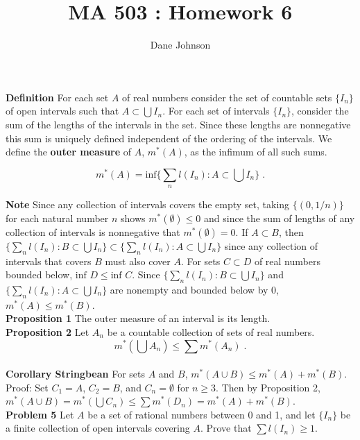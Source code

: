 \documentclass[a4paper]{article}
\title{MA 503 : Homework 6}
\author{Dane Johnson}
\begin{document}
\maketitle

{\bf Definition} For each set $A$ of real numbers consider the set of countable sets $\{I_n\}$ of open intervals such that $A \subset \bigcup I_n$. For each set of intervals $\{I_n\}$, consider the sum of the lengths of the intervals in the set. Since these lengths are nonnegative this sum is uniquely defined independent of the ordering of the intervals. We define the {\bf outer measure} of $A$, $m^*(A)$, as the infimum of all such sums.

$$m^*(A) = \text{inf}\{\sum_n l(I_n) : A \subset \bigcup I_n\} \;.$$

{\bf Note} Since any collection of intervals covers the empty set, taking $\{(0,1/n)\}$ for each natural number $n$ shows $m^*(\emptyset) \leq 0$ and since the sum of lengths of any collection of intervals is nonnegative that $m^*(\emptyset) = 0$. If $A\subset B$, then $\{\sum_n l(I_n) : B \subset \bigcup I_n\} \subset \{\sum_n l(I_n) : A \subset \bigcup I_n\}$ since any collection of intervals that covers $B$ must also cover $A$. For sets $C \subset D$ of real numbers bounded below, $\text{inf } D \leq \text{inf } C$. Since $\{\sum_n l(I_n) : B \subset \bigcup I_n\}$ and $\{\sum_n l(I_n) : A \subset \bigcup I_n\}$ are nonempty and bounded below by 0, $m^*(A) \leq m^*(B)$.\\

{\bf Proposition 1} The outer measure of an interval is its length. \\

{\bf Proposition 2} Let $A_n$ be a countable collection of sets of real numbers.
$$m^*\left(\bigcup A_n\right) \leq \sum m^*(A_n) \;.$$ \\


{\bf Corollary Stringbean} For sets $A$ and $B$, $m^*(A\cup B) \leq m^*(A) + m^*(B)$.\\

Proof: Set $C_1 = A$, $C_2 = B$, and $C_n = \emptyset$ for $n \geq 3$. Then by Proposition 2, $m^*(A\cup B) = m^*\left(\bigcup C_n\right) \leq \sum m^*(D_n) = m^*(A) + m^*(B)$. \\

{\bf Problem 5} Let $A$ be a set of rational numbers between 0 and 1, and let $\{I_n\}$ be a finite collection of open intervals covering $A$. Prove that $\sum l(I_n) \geq 1$. \\
\end{document}
